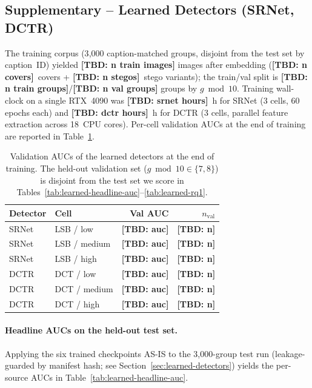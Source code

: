 \documentclass[10pt,twocolumn,a4paper]{article}
\newcommand{\TBD}[1]{\textbf{\color{red}[TBD: #1]}}
\begin{document}
\subsection{Supplementary -- Learned Detectors (SRNet, DCTR)}
\label{sec:learned-results}

The training corpus (3{,}000 caption-matched groups, disjoint from the test set by caption~ID) yielded \TBD{n train images} images after embedding (\TBD{n covers}~covers + \TBD{n stegos}~stego variants); the train/val split is \TBD{n train groups}/\TBD{n val groups} groups by $g\bmod10$. Training wall-clock on a single RTX~4090 was \TBD{srnet hours}~h for SRNet (3 cells, 60 epochs each) and \TBD{dctr hours}~h for DCTR (3 cells, parallel feature extraction across 18~CPU cores). Per-cell validation AUCs at the end of training are reported in Table~\ref{tab:learned-val-auc}.

\begin{table}[h]
\centering\small
\caption{Validation AUCs of the learned detectors at the end of training. The held-out validation set ($g\bmod10\in\{7,8\}$) is disjoint from the test set we score in Tables~\ref{tab:learned-headline-auc}--\ref{tab:learned-rq1}.}
\label{tab:learned-val-auc}
\setlength{\tabcolsep}{6pt}\renewcommand{\arraystretch}{1.1}
\begin{tabular}{@{}llrr@{}}
\toprule
\textbf{Detector} & \textbf{Cell} & \textbf{Val AUC} & \textbf{$n_\text{val}$} \\
\midrule
SRNet & LSB / low     & \TBD{auc} & \TBD{n}  \\
SRNet & LSB / medium  & \TBD{auc} & \TBD{n}  \\
SRNet & LSB / high    & \TBD{auc} & \TBD{n}  \\
DCTR  & DCT / low     & \TBD{auc} & \TBD{n}  \\
DCTR  & DCT / medium  & \TBD{auc} & \TBD{n}  \\
DCTR  & DCT / high    & \TBD{auc} & \TBD{n}  \\
\bottomrule
\end{tabular}
\end{table}

\paragraph{Headline AUCs on the held-out test set.} Applying the six trained checkpoints AS-IS to the 3{,}000-group test run (leakage-guarded by manifest hash; see Section~\ref{sec:learned-detectors}) yields the per-source AUCs in Table~\ref{tab:learned-headline-auc}.
\end{document}
